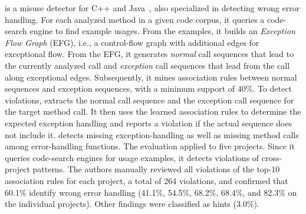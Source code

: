 \CARMiner is a misuse detector for C++ and Java~\cite{TX09}, also specialized in detecting wrong error handling.
For each analyzed method  in a given code corpus, it queries a code-search engine to find example usages.
From the examples, it builds an \emph{Exception Flow Graph} (EFG), i.e., a control-flow graph with additional edges for exceptional flow. 
From the EFG, it generates \emph{normal} call sequences that lead to the currently analyzed call and \emph{exception} call sequences that lead from the call along exceptional edges.
Subsequently, it mines association rules between normal sequences and exception sequences, with a minimum support of $40\%$.
To detect violations, \CARMiner extracts the normal call sequence and the exception call sequence for the target method call.
It then uses the learned association rules to determine the expected exception handling and reports a violation if the actual sequence does not include it.
\CARMiner detects missing exception-handling as well as missing method calls among error-handling functions.
The evaluation applied \CARMiner to five projects.
Since it queries code-search engines for usage examples, it detects violations of cross-project patterns.
The authors manually reviewed all violations of the top-10 association rules for each project, a total of 264 violations, and confirmed that 60.1\% identify wrong error handling (41.1\%, 54.5\%, 68.2\%, 68.4\%, and 82.3\% on the individual projects).
Other findings were classified as hints (3.0\%).

\vspace{0.03in}


